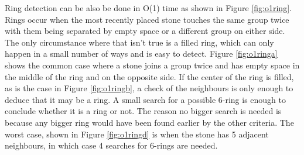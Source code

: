 Ring detection can be also be done in O(1) time as shown in Figure \ref{fig:o1ring}. Rings occur when the most recently placed stone touches the same group twice with them being separated by empty space or a different group on either side. The only circumstance where that isn't true is a filled ring, which can only happen in a small number of ways and is easy to detect. Figure \ref{fig:o1ringa} shows the common case where a stone joins a group twice and has empty space in the middle of the ring and on the opposite side. If the center of the ring is filled, as is the case in Figure \ref{fig:o1ringb}, a check of the neighbours is only enough to deduce that it may be a ring. A small search for a possible 6-ring is enough to conclude whether it is a ring or not. The reason no bigger search is needed is because any bigger ring would have been found earlier by the other criteria. The worst case, shown in Figure \ref{fig:o1ringd} is when the stone has 5 adjacent neighbours, in which case 4 searches for 6-rings are needed.

